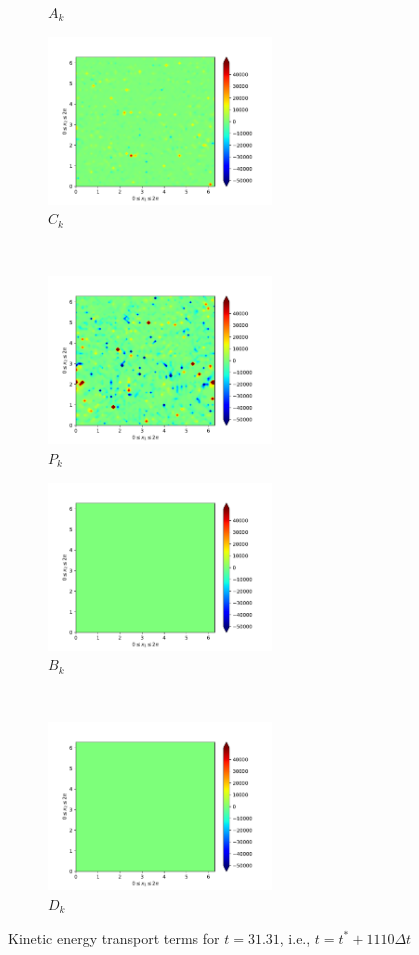 \begin{figure}[H]
\begin{subfigure}{0.45\textwidth}
        \caption{$A_{k}$}
    \end{subfigure}
    \newline
    \begin{subfigure}{0.45\textwidth}
        \includegraphics[height=1.75in]{media/run-cds-65-25k/C-ke-449.png}
        \caption{$C_{k}$}
    \end{subfigure}
    ~
    \begin{subfigure}{0.45\textwidth}
        \includegraphics[height=1.75in]{media/run-cds-65-25k/P-ke-449.png}
        \caption{$P_{k}$}
    \end{subfigure}
    \newline
    \begin{subfigure}{0.45\textwidth}
        \includegraphics[height=1.75in]{media/run-cds-65-25k/B-ke-449.png}
        \caption{$B_{k}$}
    \end{subfigure}
    ~
    \begin{subfigure}{0.45\textwidth}
        \includegraphics[height=1.75in]{media/run-cds-65-25k/D-ke-449.png}
        \caption{$D_{k}$}
    \end{subfigure}
    \caption{Kinetic energy transport terms for $t=31.31$, i.e., $t=t^{\ast} + 1110 \Delta t$}
\end{figure}
